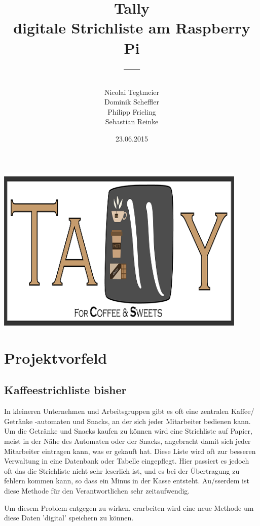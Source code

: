 \documentclass[11pt,a4paper]{article} %
\title{\normalfont\bfseries{Tally\\ digitale Strichliste am Raspberry Pi}\\---}
\author{Nicolai Tegtmeier \\ Dominik Scheffler \\ Philipp Frieling \\ Sebastian Reinke}
\date{23.06.2015}
\begin{document}



\begin{titlepage}
	\maketitle
	\includegraphics[width=12cm]{TallyLogo.png}
\end{titlepage}

\tableofcontents
\newpage

\section{Projektvorfeld}
\label{Grundlagen}


\subsection{Kaffeestrichliste bisher}

In kleineren Unternehmen und Arbeitsgruppen gibt es oft eine zentralen Kaffee/ Getr\"anke -automaten und Snacks, an der sich jeder Mitarbeiter bedienen kann. Um die Getr\"anke und Snacks kaufen zu k\"onnen wird eine Strichliste auf Papier, meist in der N\"ahe des Automaten oder der Snacks, angebracht damit sich jeder Mitarbeiter eintragen kann, was er gekauft hat. Diese Liste wird oft zur besseren Verwaltung in eine Datenbank oder Tabelle eingepflegt. Hier passiert es jedoch oft das die Strichliste nicht sehr leserlich ist, und es bei der \"Ubertragung zu fehlern kommen kann, so dass ein Minus in der Kasse entsteht. Au/ss{}erdem ist diese Methode f\"ur den Verantwortlichen sehr zeitaufwendig.
\par
Um diesem Problem entgegen zu wirken, erarbeiten wird eine neue Methode um diese Daten 'digital' speichern zu k\"onnen.
\end{document}
